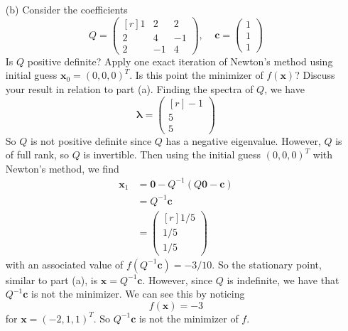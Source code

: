 \documentclass{article}
\begin{document}
\begin{itemize}
\begin{itemize}
        
        \item[(b)] Consider the coefficients
        \[Q = \begin{pmatrix*}[r]
            1 & 2 & 2\\
            2 & 4 & -1\\
            2 & -1 & 4
        \end{pmatrix*},
        \:\:\:\:\:
        \mathbf{c} = \begin{pmatrix}
            1\\
            1\\
            1
        \end{pmatrix}\]
        Is $Q$ positive definite? Apply one exact iteration of Newton's method using initial guess $\mathbf{x}_0 = (0,0,0)^T$. Is this point the minimizer of $f(\mathbf{x})$? Discuss your result in relation to part (a).
        \newline\newline
        Finding the spectra of $Q$, we have
        \[\mathbf{\lambda} = \begin{pmatrix*}[r]
            -1\\
            5\\
            5
        \end{pmatrix*}\]
        So $Q$ is not positive definite since $Q$ has a negative eigenvalue. However, $Q$ is of full rank, so $Q$ is invertible. Then using the initial guess $(0,0,0)^T$ with Newton's method, we find
        \begin{align*}
            \mathbf{x}_1 &= \mathbf{0} - Q^{-1}(Q\mathbf{0} - \mathbf{c})\\
            &= Q^{-1}\mathbf{c}\\
            &= \begin{pmatrix*}[r]
                1/5\\
                1/5\\
                1/5
            \end{pmatrix*}
        \end{align*}
        with an associated value of $f(Q^{-1}\mathbf{c}) = -3/10$.
        \newline
        So the stationary point, similar to part (a), is $\mathbf{x} = Q^{-1}\mathbf{c}$. However, since $Q$ is indefinite, we have that $Q^{-1}\mathbf{c}$ is not the minimizer. We can see this by noticing
        \[f(\mathbf{x}) = -3\]
        for $\mathbf{x} = (-2,1,1)^T$. So $Q^{-1}\mathbf{c}$ is not the minimizer of $f$.
    \end{itemize}

\end{itemize}
\end{document}
